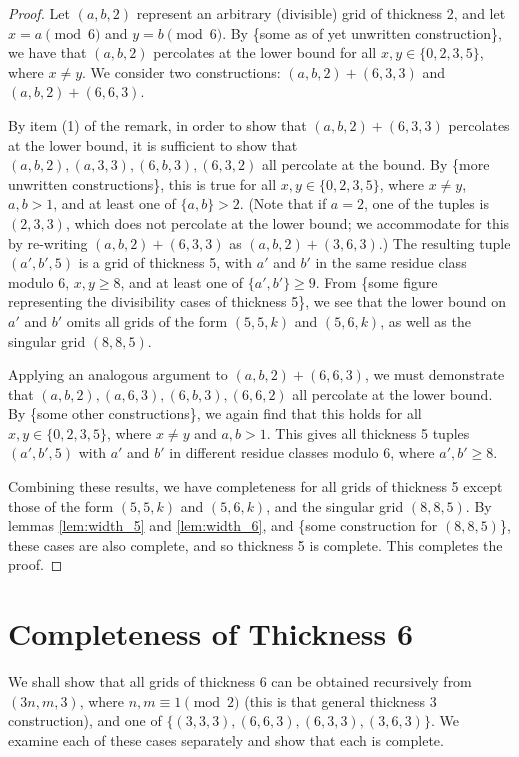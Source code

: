 \begin{proof}
Let $(a,b,2)$ represent an arbitrary (divisible) grid of thickness 2, and let $x = a \pmod 6$ and $y = b \pmod 6$. By \{some as of yet unwritten construction\}, we have that $(a,b,2)$ percolates at the lower bound for all $x,y \in \{0,2,3,5\}$, where $x \neq y$. We consider two constructions: $(a,b,2) + (6,3,3)$ and $(a,b,2) + (6,6,3)$. 

By item (1) of the remark, in order to show that $(a,b,2) + (6,3,3)$ percolates at the lower bound, it is sufficient to show that $(a,b,2), (a,3,3), (6,b,3), (6,3,2)$ all percolate at the bound. By \{more unwritten constructions\}, this is true for all $x,y \in \{0,2,3,5\}$, where $x \neq y$, $a,b > 1$, and at least one of $\{a,b\} > 2$. (Note that if $a=2$, one of the tuples is $(2,3,3)$, which does not percolate at the lower bound; we accommodate for this by re-writing $(a,b,2) + (6,3,3)$ as $(a,b,2) + (3,6,3)$.) The resulting tuple $(a', b', 5)$ is a grid of thickness 5, with $a'$ and $b'$ in the same residue class modulo $6$, $x,y \geq 8$, and at least one of $\{a',b'\} \geq 9$. From \{some figure representing the divisibility cases of thickness 5\}, we see that the lower bound on $a'$ and $b'$ omits all grids of the form $(5,5,k)$ and $(5,6,k)$, as well as the singular grid $(8,8,5)$. 

Applying an analogous argument to $(a,b,2) + (6,6,3)$, we must demonstrate that $(a,b,2), (a,6,3), (6,b,3), (6,6,2)$ all percolate at the lower bound. By \{some other constructions\}, we again find that this holds for all $x,y \in \{0,2,3,5\}$, where $x \neq y$ and $a,b > 1$. This gives all thickness 5 tuples $(a',b', 5)$ with $a'$ and $b'$ in different residue classes modulo $6$, where $a',b' \geq 8$. 

Combining these results, we have completeness for all grids of thickness 5 except those of the form $(5,5,k)$ and $(5,6,k)$, and the singular grid $(8,8,5)$. By lemmas \ref{lem:width_5} and \ref{lem:width_6}, and \{some construction for $(8,8,5)$\}, these cases are also complete, and so thickness 5 is complete. This completes the proof. 
\end{proof}

\section{Completeness of Thickness 6}
We shall show that all grids of thickness 6 can be obtained recursively from $(3n, m, 3)$, where $n,m \equiv 1 \pmod 2$ (this is that general thickness 3 construction), and one of $\{(3,3,3), (6,6,3), (6,3,3), (3,6,3)\}$. We examine each of these cases separately and show that each is complete. 

